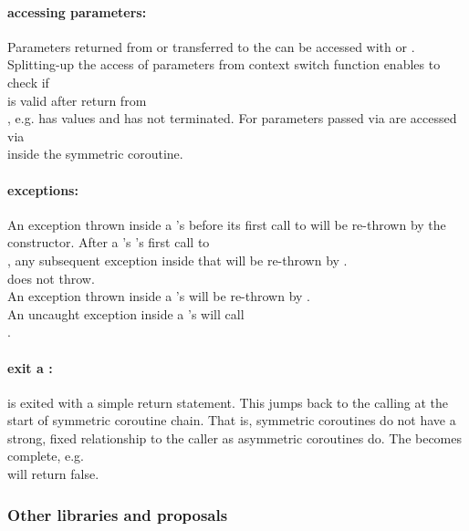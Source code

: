 \paragraph*{accessing parameters:}
Parameters returned from or transferred to the \corofunction can be accessed
with \pullcoroget or \yieldcoroget.\\
\newline
Splitting-up the access of parameters from context switch function enables to
check if\\
\pullcoro is valid after return from\\
\pullcoroop, e.g. \pullcoro has values and \corofunction has not terminated.
For parameters passed via \callcoro are accessed via\\
\yieldcoroget inside the symmetric coroutine.

\paragraph*{exceptions:}
An exception thrown inside a \pullcoro's \corofunction before its first call to
\pushcoroop will be re-thrown by the \pullcoro constructor. After a \pullcoro's
\corofunction's first call to\\
\pushcoroop, any subsequent exception inside that \corofunction will be
re-thrown by \pullcoroop.\\
\pullcoroget does not throw.\\
\newline
An exception thrown inside a \pushcoro's \corofunction will be re-thrown by
\pushcoroop.\\
\newline
An uncaught exception inside a \callcoro's \corofunction will call\\
.

\paragraph*{exit a \corofunction:}
\corofunction is exited with a simple return statement. This jumps back to the
calling \callcoroop at the start of symmetric coroutine chain. That is,
symmetric coroutines do not have a strong, fixed relationship to the caller as
asymmetric coroutines do. The \callcoro becomes complete, e.g.\\
\callcorobool will return false. 


\subsubsection*{Other libraries and proposals}
